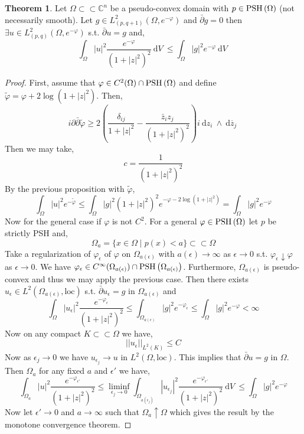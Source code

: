 \documentclass[12pt]{extarticle}
\newcommand{\C}{\mathbb{C}}
\renewcommand{\d}[1]{\: \mathrm{d}#1 \:}
\theoremstyle{definition}
\newtheorem{theorem}{Theorem}[section]
\begin{document}
\begin{theorem}
Let $\Omega \subset \subset \C^n$ be a pseudo-convex domain with $p \in \mathrm{PSH}\left( \Omega \right)$ (not necessarily smooth). Let $g \in L^2_{(p, q+1)}(\Omega, e^{-\varphi})$ and $\bar{\partial} g = 0$ then $\exists u \in L^2_{(p,q)}(\Omega, e^{-\varphi})$ s.t. $\bar{\partial} u = g$ and,
\[ \int_\Omega |u|^2 \frac{e^{-\varphi}}{(1 + |z|^2)^2} \d{V} \le \int_\Omega |g|^2 e^{-\varphi} \d{V} \]
\end{theorem}

\begin{proof}
First, assume that $\varphi \in C^2(\Omega) \cap \mathrm{PSH}\left( \Omega \right)$ and define $\tilde{\varphi} = \varphi + 2 \log{(1 + |z|^2)}$. Then,
\[ i \partial \bar{\partial} \tilde{\varphi} \ge 2 \left( \frac{\delta_{ij}}{1 + |z|^2} - \frac{\bar{z}_i z_j}{(1 + |z|^2)^2} \right) i \d{z_i} \wedge \d{\overline{z}_j} \]
Then we may take,
\[ c = \frac{1}{(1 + |z|^2)^2} \]
By the previous proposition with $\tilde{\varphi}$,
\[ \int_\Omega |u|^2 e^{-\tilde{\varphi}} \le \int_\Omega |g|^2 (1 + |z|^2)^2 e^{-\varphi - 2 \log{(1 + |z|^2)}} = \int_\Omega |g|^2 e^{-\varphi} \]
Now for the general case if $\varphi$ is not $C^2$. For a general $\varphi \in \mathrm{PSH}\left( \Omega \right)$ let $p$ be strictly PSH and,
\[ \Omega_a = \{ x \in \Omega \mid p(x) < a \} \subset \subset \Omega \]
Take a regularization of $\varphi_\epsilon$ of $\varphi$ on $\Omega_{a(\epsilon)}$ with $a(\epsilon) \to \infty$ as $\epsilon \to 0$ s.t. $\varphi_\epsilon \downarrow \varphi$ as $\epsilon \to 0$. We have $\varphi_\epsilon \in C^\infty(\Omega_{a(\epsilon)}) \cap \mathrm{PSH}\left( \Omega_{a(\epsilon)} \right)$. Furthermore, $\Omega_{a(\epsilon)}$ is pseudo-convex and thus we may apply the previous case. Then there exists $u_\epsilon \in L^2(\Omega_{a(\epsilon)}, \text{loc})$ s.t. $\bar{\partial} u_\epsilon = g$ in $\Omega_{a(\epsilon)}$ and
\[ \int_\Omega | u_\epsilon |^2 \frac{e^{-\varphi_\epsilon}}{(1 + |z|^2)^2} \le \int_{\Omega_{a(\epsilon)}} |g|^2 e^{-\varphi_\epsilon} \le \int_\Omega |g|^2 e^{-\varphi} < \infty \]
Now on any compact $K \subset \subset \Omega$ we have,
\[ || u_\epsilon ||_{L^2(K)} \le C \]
Now as $\epsilon_j \to 0$ we have $u_{\epsilon_j} \to u$ in $L^2(\Omega, \text{loc})$. This implies that $\bar{\partial} u = g$ in $\Omega$. Then $\Omega_a$ for any fixed $a$ and $\epsilon'$ we have,
\[ \int_{\Omega_a} |u|^2 \frac{e^{-\varphi_{\epsilon'}}}{(1 + |z|^2)^2} \le \liminf_{\epsilon_j \to 0} \int_{\Omega_{a(\epsilon_j)}} |u_{\epsilon_j} |^2 \frac{e^{-\varphi_{\epsilon'}}}{(1 + |z|^2)^2} \d{V} \le \int_\Omega |g|^2 e^{-\varphi} \]
Now let $\epsilon' \to 0$ and $a \to \infty$ such that $\Omega_a \uparrow \Omega$ which gives the result by the monotone convergence theorem. 
\end{proof}
\end{document}

